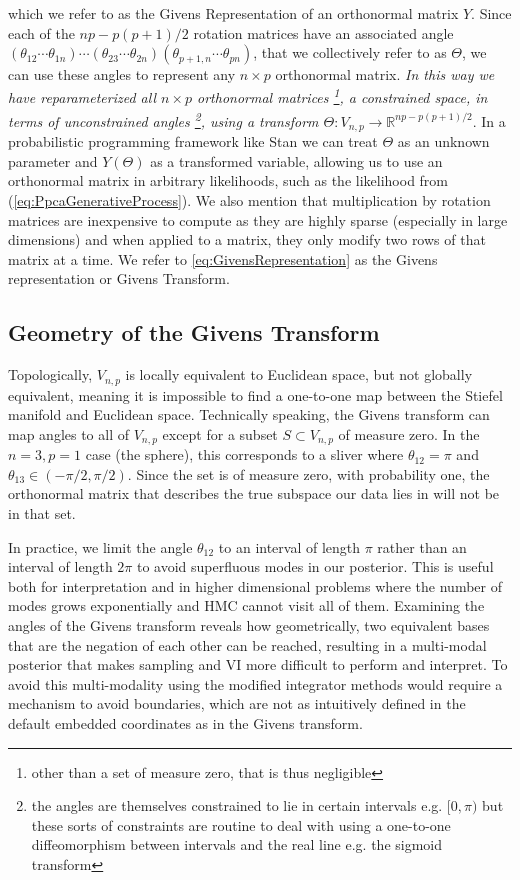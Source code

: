 \documentclass{article}
\begin{document}
which we refer to as the Givens Representation of an orthonormal matrix $Y$. Since each of the $np -p(p+1)/2$ rotation matrices have an associated  angle $(\theta_{12} \cdots \theta_{1n}) \cdots (\theta_{23} \cdots \theta_{2n}) (\theta_{p+1,n} \cdots \theta_{pn})$, that we collectively refer to as $\Theta$, we can use these angles to represent any $n \times p$ orthonormal matrix. \textit{In this way we have reparameterized all $n \times p$ orthonormal matrices \footnote{other than a set of measure zero, that is thus negligible}, a constrained space, in terms of unconstrained angles \footnote{the angles are themselves constrained to lie in certain intervals e.g. $[0, \pi)$ but these sorts of constraints are routine to deal with using a one-to-one diffeomorphism between intervals and the real line e.g. the sigmoid transform}, using a transform $\Theta: V_{n,p} \to \mathbb{R}^{np -p(p+1)/2}$}. In a probabilistic programming framework like Stan we can treat $\Theta$ as an unknown parameter and $Y(\Theta)$ as a transformed variable, allowing us to use an orthonormal matrix in arbitrary likelihoods, such as the likelihood from (\ref{eq:PpcaGenerativeProcess}). We also mention that multiplication by rotation matrices are inexpensive to compute as they are highly sparse (especially in large dimensions) and when applied to a matrix, they only modify two rows of that matrix at a time. We refer to \ref{eq:GivensRepresentation} as the Givens representation or Givens Transform.

\subsection{Geometry of the Givens Transform}\label{geomGivens}

Topologically, $V_{n,p}$ is locally equivalent to Euclidean space, but not globally equivalent, meaning it is impossible to find a one-to-one map between the Stiefel manifold and Euclidean space. Technically speaking, the Givens transform can map angles to all of $V_{n,p}$ except for a subset $S \subset V_{n,p}$ of measure zero.  In the $n=3, p=1$ case (the sphere), this corresponds to a sliver where $\theta_{12} = \pi$ and $\theta_{13} \in (-\pi/2, \pi/2)$. Since the set is of measure zero, with probability one, the orthonormal matrix that describes the true subspace our data lies in will not be in that set. 

In practice, we limit the angle $\theta_{12}$ to an interval of length $\pi$ rather than an interval of length $2\pi$ to avoid superfluous modes in our posterior. This is useful both for interpretation and in higher dimensional problems where the number of modes grows exponentially and HMC cannot visit all of them.   Examining the angles of the Givens transform reveals how geometrically, two equivalent bases that are the negation of each other can be reached, resulting in a multi-modal posterior that makes sampling and VI more difficult to perform and interpret. To avoid this multi-modality using the modified integrator methods would require a mechanism to avoid boundaries, which are not as intuitively defined in the default embedded coordinates as in the Givens transform.
\end{document}
